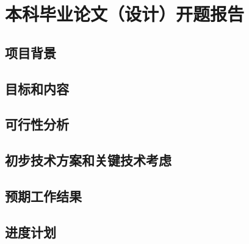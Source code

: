 \chapter{本科毕业论文（设计）开题报告}

\section{项目背景}

\section{目标和内容}

\section{可行性分析}

\section{初步技术方案和关键技术考虑}

\section{预期工作结果}

\section{进度计划} 